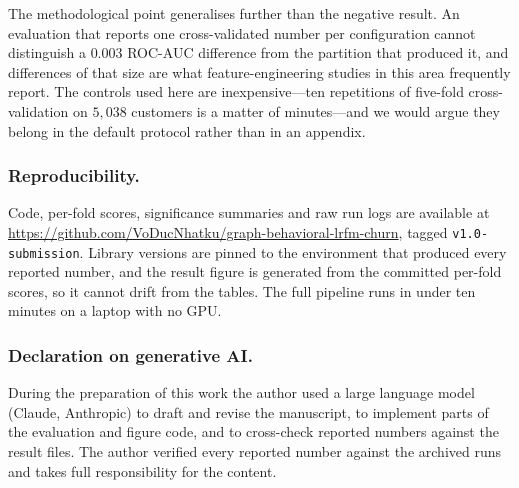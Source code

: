 \documentclass[runningheads]{llncs}
\begin{document}
The methodological point generalises further than the negative result. An
evaluation that reports one cross-validated number per configuration cannot
distinguish a $0.003$ ROC-AUC difference from the partition that produced it, and
differences of that size are what feature-engineering studies in this area
frequently report. The controls used here are inexpensive---ten repetitions of
five-fold cross-validation on $5{,}038$ customers is a matter of minutes---and we
would argue they belong in the default protocol rather than in an appendix.

\subsubsection{Reproducibility.}
Code, per-fold scores, significance summaries and raw run logs are available at
\url{https://github.com/VoDucNhatku/graph-behavioral-lrfm-churn}, tagged
\texttt{v1.0-submission}. Library versions are pinned to the environment that
produced every reported number, and the result figure is generated from the
committed per-fold scores, so it cannot drift from the tables. The full pipeline
runs in under ten minutes on a laptop with no GPU.

\subsubsection{Declaration on generative AI.}
During the preparation of this work the author used a large language model
(Claude, Anthropic) to draft and revise the manuscript, to implement parts of the
evaluation and figure code, and to cross-check reported numbers against the
result files. The author verified every reported number against the archived runs
and takes full responsibility for the content.



\end{document}
